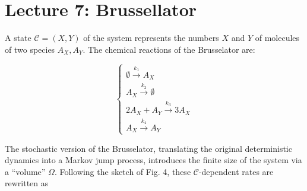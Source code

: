 \chapter*{Lecture 7: Brussellator}

A state $\mathcal{C}=(X,Y)$ of the system represents the numbers $X$ and $Y$ of molecules of two species $A_X,A_Y.$ 
The chemical reactions of the Brusselator are:

$$
\begin{cases}
    \emptyset\xrightarrow{k_1}A_X \\
    A_X\xrightarrow{k_2}\emptyset  \\
    2A_X+A_Y \xrightarrow{k_3} 3A_X\\
    A_X\xrightarrow{k_4} A_Y
\end{cases}
$$

The stochastic version of the Brusselator, translating the original deterministic dynamics into a Markov jump process, 
introduces the finite size of the system via a “volume” $\Omega$. 
Following the sketch of Fig. 4, these $\mathcal{C}$-dependent rates are rewritten as
